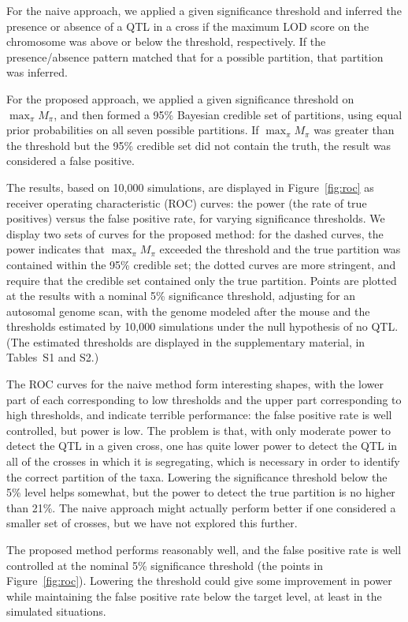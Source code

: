 \documentclass[12pt,letterpaper]{article}
\begin{document}
For the naive approach, we applied a given significance threshold and
inferred the presence or absence of a QTL in a cross if the maximum
LOD score on the chromosome was above or below the threshold,
respectively.  If the presence/absence pattern matched that for a
possible partition, that partition was inferred.

For the proposed approach, we applied a given significance threshold
on $\max_\pi M_\pi$, and then formed a 95\% Bayesian credible set of
partitions, using equal prior probabilities on all seven possible partitions.  If $\max_\pi M_\pi$ was
greater than the threshold but the 95\% credible set did not contain the
truth, the result was considered a false positive.

The results, based on 10,000 simulations, are displayed in
Figure~\ref{fig:roc} as receiver operating characteristic (ROC)
curves: the power (the rate of true positives) versus
the false positive rate, for varying significance thresholds.  We
display two sets of curves for the proposed method: for the dashed
curves, the power indicates that $\max_\pi M_\pi$ exceeded the threshold
and the true partition was contained within the 95\% credible set;
the dotted curves are more stringent, and require that the credible
set contained only the true partition.  Points are plotted at the
results with a nominal 5\% significance threshold, adjusting for an
autosomal genome scan, with the genome modeled after the mouse and the
thresholds estimated by 10,000 simulations under the null hypothesis
of no QTL. (The estimated thresholds are displayed in the
supplementary material, in Tables~S1 and S2.)

The ROC curves for the naive method form interesting shapes, with the
lower part of each corresponding to low thresholds and the upper part
corresponding to high thresholds, and indicate terrible performance:
the false positive rate is well controlled, but power is low.
The problem is that, with only moderate power to detect the QTL in a
given cross, one has quite lower power to detect the QTL in all of the
crosses in which it is segregating, which is necessary in order to
identify the correct partition of the taxa.  Lowering the significance
threshold below the 5\% level helps somewhat, but the power to detect
the true partition is no higher than 21\%.  The naive approach might
actually perform better if one considered a smaller set of crosses,
but we have not explored this further.

The proposed method performs reasonably well, and the false positive
rate is well controlled at the nominal 5\% significance threshold (the
points in Figure~\ref{fig:roc}).
Lowering the threshold could give some improvement in power while
maintaining the false positive rate below the target level, at least
in the simulated situations.
\end{document}
